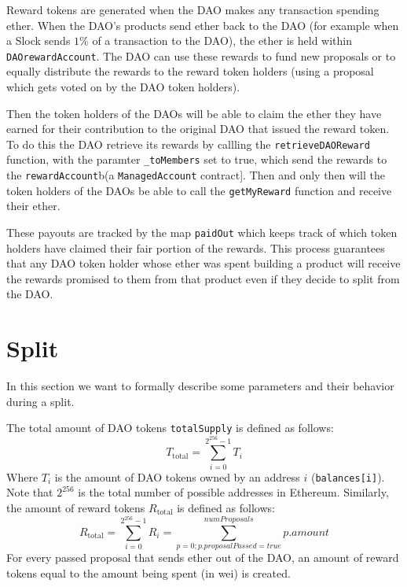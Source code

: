 \documentclass[9pt,oneside]{amsart}
\begin{document}
\begin{multicols}{2}
Reward tokens are generated when the DAO makes any transaction spending ether. When the DAO’s products send ether back to the DAO (for example when a Slock sends $1\%$ of a transaction to the DAO), the ether is held within \verb|DAOrewardAccount|. The DAO can use these rewards to fund new proposals or to equally distribute the rewards to the reward token holders (using a proposal which gets voted on by the DAO token holders).

Then the token holders of the DAOs will be able to claim the ether they have earned for their contribution to the original DAO that issued the reward token. To do this the DAO retrieve its rewards by callling the \verb|retrieveDAOReward| function, with the paramter \verb|_toMembers| set to true, which send the rewards to the \verb|rewardAccount|b(a \verb|ManagedAccount| contract]. Then and only then will the token holders of the DAOs be able to call the \verb|getMyReward| function and receive their ether.

These payouts are tracked by the map \verb|paidOut| which keeps track of which token holders have claimed their fair portion of the rewards. This process guarantees that any DAO token holder whose ether was spent building a product will receive the rewards promised to them from that product even if they decide to split from the DAO. 

\section{Split} \label{split}

In this section we want to formally describe some parameters and their behavior during a split.

The total amount of DAO tokens \verb|totalSupply| is defined as follows:
\begin{equation}
T_{\text{total}} = \sum_{i=0}^{2^{256}-1} T_i
\end{equation}
Where $T_i$ is the amount of DAO tokens owned by an address $i$ (\verb|balances[i]|). Note that  $2^{256}$ is the total number of possible addresses in Ethereum.
Similarly, the amount of reward tokens $R_{\text{total}}$ is defined as follows:
\begin{equation}
 R_{\text{total}} = \sum_{i=0}^{2^{256}-1} R_i = \sum_{p=0; p.proposalPassed = true}^{numProposals} p.amount
\end{equation}
For every passed proposal that sends ether out of the DAO, an amount of reward tokens equal to the amount being spent (in wei) is created.



\end{multicols}
\end{document}
